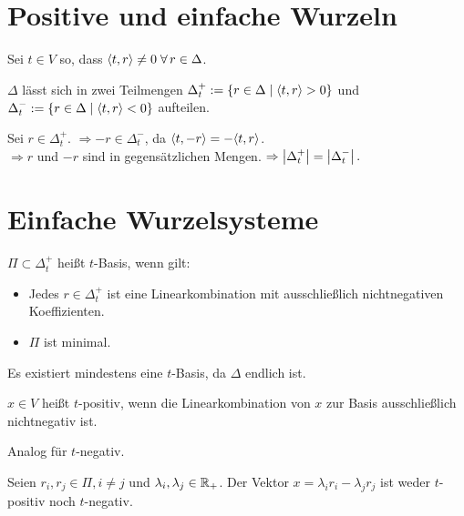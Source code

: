 \documentclass{handout}
\begin{document}
\maketitle
\section{Positive und einfache Wurzeln}
\begin{defi}
    Sei \( t \in V \) so, dass \( \scalarprod{t}{r} \neq 0 
    \; \forall r \in \Delta \).

    \( \Delta \) lässt sich in zwei Teilmengen 
    \( \Delta_t^+ := 
    \{r \in \Delta \;\vert \; \langle t, r \rangle > 0\} \) 
    und \( \Delta_t^- := 
    \{r \in \Delta \;\vert \; \langle t, r \rangle < 0\} \) 
    aufteilen. 
\end{defi}

Sei \( r \in \Delta_t^+ \). \( \Rightarrow -r \in \Delta_t^- \), 
da \( \langle t, -r \rangle = -\langle t, r \rangle \).\\
\( \Rightarrow r \) und \( -r \) sind in 
gegensätzlichen Mengen. 
\( \Rightarrow \left|\Delta_t^+\right| = \left|\Delta_t^-\right|. \)

\section{Einfache Wurzelsysteme}
\begin{defi}[\( t \)-Basis]
    \( \Pi \subset \Delta_t^+ \) heißt \( t \)-Basis, 
    wenn gilt:
    \begin{itemize}
        \item Jedes \( r \in \Delta_t^+ \) ist 
        eine Linearkombination mit ausschließlich 
        nichtnegativen Koeffizienten.
        \item \( \Pi \) ist minimal.
    \end{itemize}
    Es existiert mindestens eine \( t \)-Basis, 
    da \( \Delta \) endlich ist.
\end{defi}

\begin{defi}[\( t \)-positiv]
    \( x \in V \) heißt \(t\)-positiv, wenn 
    die Linearkombination von \(x\) zur 
    Basis ausschließlich nichtnegativ ist.

    Analog für \( t \)-negativ.
\end{defi}

\begin{satz}
    Seien \( r_i, r_j \in \Pi, i \neq j \) und 
    \( \lambda_i, \lambda_j \in \mathbb{R}_+ \). 
    Der Vektor \( x = \lambda_i r_i - \lambda_j r_j \) 
    ist weder \( t \)-positiv noch \( t \)-negativ.
\end{satz}
\end{document}
